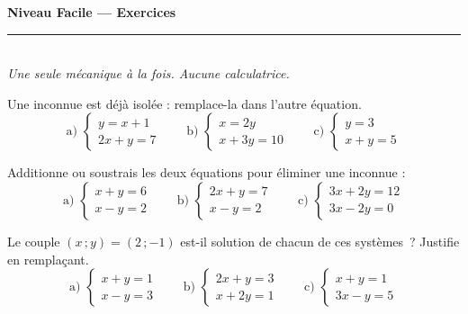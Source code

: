 \documentclass[11pt,a4paper]{article}
\begin{document}
\begin{center}
{\LARGE\bfseries\color{primarydark} Niveau Facile — Exercices}\\[2pt]
{\color{primary}\rule{0.45\textwidth}{1.2pt}}\\[3pt]
{\small\itshape Une seule mécanique à la fois. Aucune calculatrice.}
\end{center}
\vspace{1mm}

\begin{exo}
Une inconnue est déjà isolée : remplace-la dans l'autre équation.
\[ \text{a) }\begin{cases} y=x+1\\ 2x+y=7\end{cases}\qquad
   \text{b) }\begin{cases} x=2y\\ x+3y=10\end{cases}\qquad
   \text{c) }\begin{cases} y=3\\ x+y=5\end{cases} \]
\end{exo}

\begin{exo}
Additionne ou soustrais les deux équations pour éliminer une inconnue :
\[ \text{a) }\begin{cases} x+y=6\\ x-y=2\end{cases}\qquad
   \text{b) }\begin{cases} 2x+y=7\\ x-y=2\end{cases}\qquad
   \text{c) }\begin{cases} 3x+2y=12\\ 3x-2y=0\end{cases} \]
\end{exo}

\begin{exo}
Le couple $(x\,;y)=(2\,;-1)$ est-il solution de chacun de ces systèmes~? Justifie en remplaçant.
\[ \text{a) }\begin{cases} x+y=1\\ x-y=3\end{cases}\qquad
   \text{b) }\begin{cases} 2x+y=3\\ x+2y=1\end{cases}\qquad
   \text{c) }\begin{cases} x+y=1\\ 3x-y=5\end{cases} \]
\end{exo}
\end{document}
